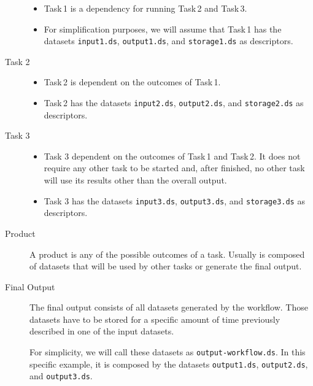 \documentclass[a4paper]{article}
\begin{document}
\begin{description}
\begin{itemize}
\item Task\,1 is a dependency for running Task\,2 and Task\,3.

\item For simplification purposes, we will assume that Task\,1 has the datasets \texttt{input1.ds}, \texttt{output1.ds}, and \texttt{storage1.ds} as descriptors.

\end{itemize}

\item[Task 2]

\begin{itemize}

\item Task\,2 is dependent on the outcomes of Task\,1.

\item Task\,2 has the datasets \texttt{input2.ds}, \texttt{output2.ds}, and \texttt{storage2.ds} as descriptors.

\end{itemize}

\item[Task 3]

\begin{itemize}

\item Task 3 dependent on the outcomes of Task\,1 and Task\,2. It does not require any other task to be started and, after finished, no other task will use its results other than the overall output.

\item Task 3 has the datasets \texttt{input3.ds}, \texttt{output3.ds}, and \texttt{storage3.ds} as descriptors.

\end{itemize}

\item[Product]

A product is any of the possible outcomes of a task. Usually is composed of datasets that will be used by other tasks or generate the final output.

\item[Final Output]

The final output consists of all datasets generated by the workflow. Those datasets have to be stored for a specific amount of time previously described in one of the input datasets.

For simplicity, we will call these datasets as \texttt{output-workflow.ds}. In this specific example, it is composed by the datasets \texttt{output1.ds}, \texttt{output2.ds}, and \texttt{output3.ds}.

\end{description}
\end{document}
